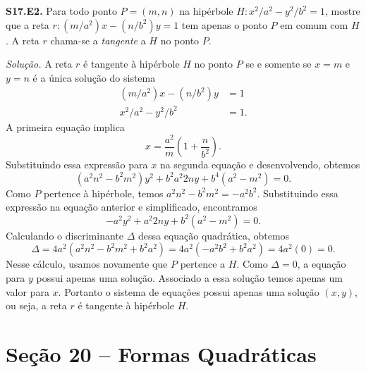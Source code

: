 \documentclass[a4paper,11pt]{article}
\begin{document}
\textbf{S17.E2.}
Para todo ponto $P = (m,n)$ na hipérbole $H : x^2/a^2 - y^2/b^2 = 1$, mostre que a reta $r: (m/a^2)x - (n/b^2)y = 1$ tem apenas o ponto $P$ em comum com $H$.
A reta $r$ chama-se a \emph{tangente} a $H$ no ponto $P$.

\vspace{\baselineskip}

\emph{Solução.}
A reta $r$ é tangente à hipérbole $H$ no ponto $P$ se e somente se $x = m$ e $y = n$ é a única solução do sistema
\begin{align*}
  (m/a^2) x - (n/b^2) y & = 1 \\
  x^2/a^2 - y^2/b^2 & = 1.
\end{align*}
A primeira equação implica
\[
  x = \frac{a^2}{m} \left( 1 + \frac{n}{b^2} \right).
\]
Substituindo essa expressão para $x$ na segunda equação e desenvolvendo, obtemos
\[
  (a^2 n^2 - b^2 m^2) y^2 + b^2 a^2 2ny + b^4(a^2 - m^2) = 0.
\]
Como $P$ pertence à hipérbole, temos $a^2 n^2 - b^2 m^2 = -a^2 b^2$.
Substituindo essa expressão na equação anterior e simplificado, encontramos
\[
  -a^2 y^2 + a^2 2ny + b^2 (a^2 - m^2) = 0.
\]
Calculando o discriminante $\Delta$ dessa equação quadrática, obtemos
\[
  \Delta = 4 a^2 ( a^2 n^2 - b^2 m^2 + b^2 a^2 ) = 4 a^2 (-a^2 b^2 + b^2 a^2 ) = 4 a^2 (0) = 0.
\]
Nesse cálculo, usamos novamente que $P$ pertence a $H$.
Como $\Delta = 0$, a equação para $y$ possui apenas uma solução.
Associado a essa solução temos apenas um valor para $x$.
Portanto o sistema de equações possui apenas uma solução $(x,y)$, ou seja, a reta $r$ é tangente à hipérbole $H$.

\section*{Seção 20 -- Formas Quadráticas}
\end{document}
